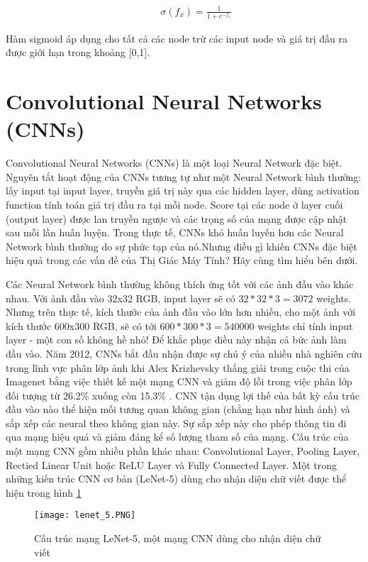 \begin{eqnarray}
	\label{eq:sigmoid_function}
	\hspace{1cm} \sigma(f_x) = \frac{1}{1 + e^{-f_x}}
\end{eqnarray}

Hàm sigmoid áp dụng cho tất cả các node trừ các input node và giá trị đầu ra được giới hạn trong khoảng [0,1].

\section{Convolutional Neural Networks (CNNs)}
Convolutional Neural Networks (CNNs) là một loại Neural Network đặc biệt. Nguyên tắt hoạt động của CNNs tương tự như một Neural Network bình thường: lấy input tại input layer, truyền giá trị này qua các hidden layer, dùng activation function tính toán giá trị đầu ra tại mỗi node. Score tại các node ở layer cuối (output layer) được lan truyền ngược và các trọng số của mạng được cập nhật sau mỗi lần huấn luyện. Trong thực tế, CNNs khó huấn luyến hơn các Neural Network bình thường do sự phức tạp của nó.Nhưng điều gì khiến CNNs đặc biệt hiệu quả trong các vấn đề của Thị Giác Máy Tính? Hãy cùng tìm hiểu bên dưới.

Các Neural Network bình thường không thích ứng tốt với các ảnh đầu vào khác nhau. Với ảnh đầu vào 32x32 RGB, input layer sẽ có $32*32*3 = 3072$ weights. Nhưng trên thực tế, kích thước của ảnh đầu vào lớn hơn nhiều, cho một ảnh với kích thước 600x300 RGB, sẽ có tới $600*300*3 = 540000$ weights chỉ tính input layer - một con số không hề nhỏ! Để khắc phục điều này nhận cả bức ảnh làm đầu vào. Năm 2012, CNNs bắt đầu nhận được sự chú ý của nhiều nhà nghiên cứu trong lĩnh vực phân lớp ảnh khi Alex Krizhevsky thắng giải trong cuộc thi của Imagenet bằng việc thiết kế một mạng CNN và giảm độ lỗi trong việc phân lớp đối tượng từ 26.2\% xuống còn 15.3\% \cite{krizhevsky2012imagenet}. CNN tận dụng lợi thế của bất kỳ cấu trúc đầu vào nào thể hiện mối tương quan không gian (chẳng hạn như hình ảnh) và sắp xếp các neural theo không gian này. Sự sắp xếp này cho phép thông tin đi qua mạng hiệu quả và giảm đáng kể số lượng tham số của mạng. Cấu trúc của một mạng CNN gồm nhiều phần khác nhau: Convolutional Layer, Pooling Layer, Rectied Linear Unit hoặc ReLU Layer và Fully Connected Layer. Một trong những kiến trúc CNN cơ bản (LeNet-5) \cite{lecun1998gradient} dùng cho nhận diện chữ viết được thể hiện trong hình \ref{fig:lenet_5}

\begin{figure}[h!]
	\centering
	\captionsetup{width=0.7\textwidth}
	\texttt{[image: lenet\_5.PNG]}
	\caption{Cấu trúc mạng LeNet-5, một mạng CNN dùng cho nhận diện chữ viết}
    \label{fig:lenet_5}
\end{figure}

